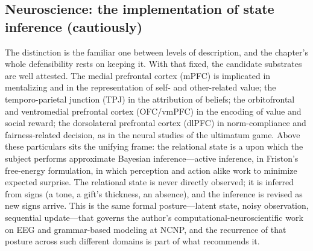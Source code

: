 \subsection{Neuroscience: the implementation of state inference (cautiously)}
 The distinction is the familiar one between levels of description, and the chapter's whole defensibility rests on keeping it. With that fixed, the candidate substrates are well attested. The medial prefrontal cortex (mPFC) is implicated in mentalizing and in the representation of self- and other-related value; the temporo-parietal junction (TPJ) in the attribution of beliefs; the orbitofrontal and ventromedial prefrontal cortex (OFC/vmPFC) in the encoding of value and social reward; the dorsolateral prefrontal cortex (dlPFC) in norm-compliance and fairness-related decision, as in the neural studies of the ultimatum game. Above these particulars sits the unifying frame: the relational state is a  upon which the subject performs approximate Bayesian inference---active inference, in Friston's free-energy formulation, in which perception and action alike work to minimize expected surprise. The relational state is never directly observed; it is inferred from signs (a tone, a gift's thickness, an absence), and the inference is revised as new signs arrive. This is the same formal posture---latent state, noisy observation, sequential update---that governs the author's computational-neuroscientific work on EEG and grammar-based modeling at NCNP, and the recurrence of that posture across such different domains is part of what recommends it.

